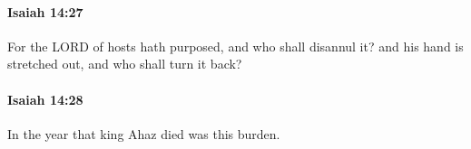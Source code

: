 		\paragraph{Isaiah 14:27} %
			\label{ISAIAH-14-27}

			For the LORD of hosts hath purposed, and who shall disannul it? and his hand is stretched out, and who shall turn it back?


		\paragraph{Isaiah 14:28} %
			\label{ISAIAH-14-28}

			In the year that king Ahaz died was this burden.


